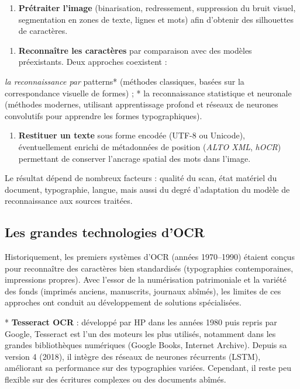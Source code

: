 \begin{enumerate}
\item \textbf{Prétraiter l’image} (binarisation, redressement, suppression du bruit visuel, segmentation en zones de texte, lignes et mots) afin d’obtenir des silhouettes de caractères.
\end{enumerate}

\begin{enumerate}
\item \textbf{Reconnaître les caractères} par comparaison avec des modèles préexistants. Deux approches coexistent :
\end{enumerate}
   
   \emph{ la reconnaissance par }patterns* (méthodes classiques, basées sur la correspondance visuelle de formes) ;
   * la reconnaissance statistique et neuronale (méthodes modernes, utilisant apprentissage profond et réseaux de neurones convolutifs pour apprendre les formes typographiques).

\begin{enumerate}
\item \textbf{Restituer un texte} sous forme encodée (UTF-8 ou Unicode), éventuellement enrichi de métadonnées de position (\emph{ALTO XML}, \emph{hOCR}) permettant de conserver l’ancrage spatial des mots dans l’image.
\end{enumerate}

Le résultat dépend de nombreux facteurs : qualité du scan, état matériel du document, typographie, langue, mais aussi du degré d’adaptation du modèle de reconnaissance aux sources traitées.

\subsection{Les grandes technologies d’OCR}

Historiquement, les premiers systèmes d’OCR (années 1970–1990) étaient conçus pour reconnaître des caractères bien standardisés (typographies contemporaines, impressions propres). Avec l’essor de la numérisation patrimoniale et la variété des fonds (imprimés anciens, manuscrits, journaux abîmés), les limites de ces approches ont conduit au développement de solutions spécialisées.

* \textbf{Tesseract OCR} : développé par HP dans les années 1980 puis repris par Google, Tesseract est l’un des moteurs les plus utilisés, notamment dans les grandes bibliothèques numériques (Google Books, Internet Archive). Depuis sa version 4 (2018), il intègre des réseaux de neurones récurrents (LSTM), améliorant sa performance sur des typographies variées. Cependant, il reste peu flexible sur des écritures complexes ou des documents abîmés.


